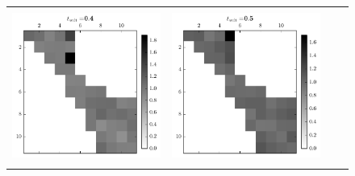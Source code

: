 \begin{figure}[h]
\begin{tabular}{cccc}
    \\
     & \\
    \includegraphics[scale=0.75]{images/results/matshows/homog_sp0_matshow_3}
    &
    \includegraphics[scale=0.75]{images/results/matshows/homog_sp0_matshow_4}
    \\
    &  \\
    \end{tabular}
\end{figure}


